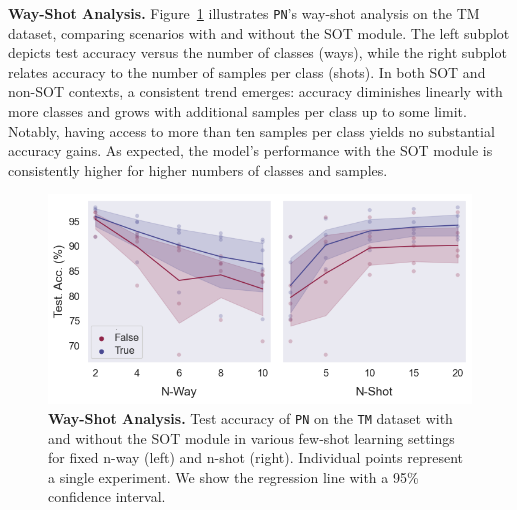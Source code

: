 \textbf{Way-Shot Analysis.} Figure~\ref{fig:way-shot} illustrates \texttt{PN}'s way-shot analysis on the TM dataset, comparing scenarios with and without the SOT module. The left subplot depicts test accuracy versus the number of classes (ways), while the right subplot relates accuracy to the number of samples per class (shots). In both SOT and non-SOT contexts, a consistent trend emerges: accuracy diminishes linearly with more classes and grows with additional samples per class up to some limit. Notably, having access to more than ten samples per class yields no substantial accuracy gains. As expected, the model's performance with the SOT module is consistently higher for higher numbers of classes and samples.

\begin{figure}[h!]
    \centering
    \includegraphics[width=1\columnwidth]{figures/way-shot.png}
    \caption{\textbf{Way-Shot Analysis.} Test accuracy of \texttt{PN} on the \texttt{TM} dataset with and without the SOT module in various 
    few-shot learning settings for fixed n-way (left) and n-shot (right). Individual points represent a single experiment. We show the regression line with a 95\% confidence interval.}
    \label{fig:way-shot}
\end{figure}
